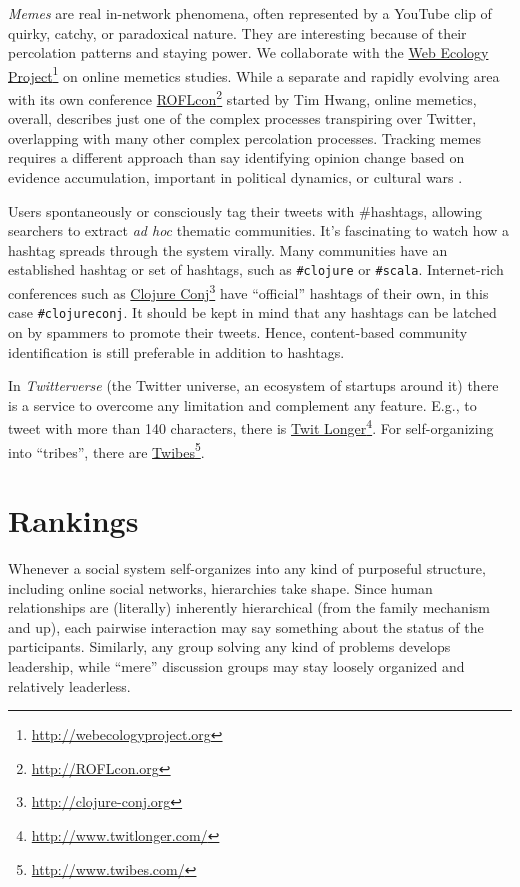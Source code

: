 \documentclass[10pt,oneside]{memoir}
\begin{document}
\begin{Spacing}{2}
{\itshape Memes} are real in-network phenomena, often represented by a YouTube clip of quirky, catchy, or paradoxical nature.  They are interesting because of their percolation patterns and staying power.  We collaborate with the \href{http://webecologyproject.org}{Web Ecology Project}\footnote{\href{http://webecologyproject.org}{http://webecologyproject.org}} on online memetics studies.  While a separate and rapidly evolving area with its own conference \href{http://ROFLcon.org}{ROFLcon}\footnote{\href{http://ROFLcon.org}{http://ROFLcon.org}} started by Tim Hwang, online memetics, overall, describes just one  of the complex processes transpiring over Twitter, overlapping with many other complex percolation processes.  Tracking memes requires a different approach than say identifying opinion change based on evidence accumulation, important in political dynamics, or cultural wars \cite{Sudweeks:2010:Cultural}.


Users spontaneously or consciously tag their tweets with \#hashtags, allowing searchers to extract {\itshape ad hoc} thematic communities.  It's fascinating to watch how a hashtag spreads through the system virally.  Many communities have an established hashtag or set of hashtags, such as \texttt{\#clojure} or \texttt{\#scala}.  Internet-rich conferences such as \href{http://clojure-conj.org}{Clojure Conj}\footnote{\href{http://clojure-conj.org}{http://clojure-conj.org}} have ``official'' hashtags of their own, in this case \texttt{\#clojureconj}.   It should be kept in mind that any hashtags can be latched on by spammers to promote their tweets.  Hence, content-based community identification is still preferable in addition to hashtags.


In {\itshape Twitterverse} (the Twitter universe, an ecosystem of startups around it) there is a service to overcome any limitation and complement any feature.  E.g., to tweet with more than 140 characters, there is \href{http://www.twitlonger.com/}{Twit Longer}\footnote{\href{http://www.twitlonger.com/}{http://www.twitlonger.com/}}.  For self-organizing into ``tribes'', there are \href{http://www.twibes.com/}{Twibes}\footnote{\href{http://www.twibes.com/}{http://www.twibes.com/}}.


\pagebreak \section{Rankings}
\label{rankings}

Whenever a social system self-organizes into any kind of purposeful structure, including online social networks, hierarchies take shape.  Since human relationships are (literally) inherently hierarchical (from the family mechanism and up), each pairwise interaction may say something about the status of the participants.  Similarly, any group solving any kind of problems develops leadership, while ``mere'' discussion groups may stay loosely organized and relatively leaderless.



\end{Spacing}
\end{document}
